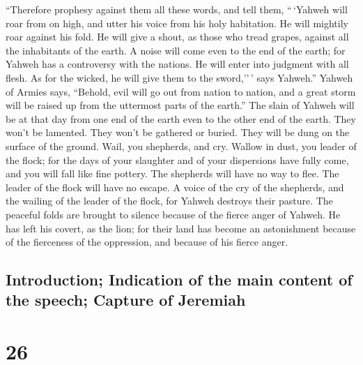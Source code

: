  ``Therefore prophesy against them all these words, and
tell them, ``\,`Yahweh will roar from on high, and utter his voice from
his holy habitation. He will mightily roar against his fold. He will
give a shout, as those who tread grapes, against all the inhabitants of
the earth.  A noise will come even to the end of the
earth; for Yahweh has a controversy with the nations. He will enter into
judgment with all flesh. As for the wicked, he will give them to the
sword,''\,' says Yahweh.''  Yahweh of Armies says,
``Behold, evil will go out from nation to nation, and a great storm will
be raised up from the uttermost parts of the earth.'' 
The slain of Yahweh will be at that day from one end of the earth even
to the other end of the earth. They won't be lamented. They won't be
gathered or buried. They will be dung on the surface of the ground.
 Wail, you shepherds, and cry. Wallow in dust, you leader
of the flock; for the days of your slaughter and of your dispersions
have fully come, and you will fall like fine pottery. 
The shepherds will have no way to flee. The leader of the flock will
have no escape.  A voice of the cry of the shepherds, and
the wailing of the leader of the flock, for Yahweh destroys their
pasture.  The peaceful folds are brought to silence
because of the fierce anger of Yahweh.  He has left his
covert, as the lion; for their land has become an astonishment because
of the fierceness of the oppression, and because of his fierce anger.

\hypertarget{introduction-indication-of-the-main-content-of-the-speech-capture-of-jeremiah}{%
\subsection{Introduction; Indication of the main content of the speech;
Capture of
Jeremiah}\label{introduction-indication-of-the-main-content-of-the-speech-capture-of-jeremiah}}

\hypertarget{section-25}{%
\section{26}\label{section-25}}

